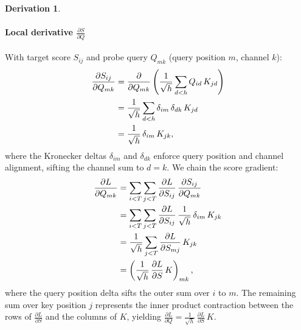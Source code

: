 \documentclass[letterpaper, 10 pt, conference]{ieeeconf}
\newcommand{\pdv}[2]{\frac{\partial #1}{\partial #2}}
\newcommand{\dL}[1]{\pdv{L}{#1}}
\newcommand{\kron}[2]{\delta_{#1 #2}}
\theoremstyle{definition}
\newtheorem*{derivation}{Derivation}
\begin{document}
\begin{derivation}
  \paragraph{Local derivative $\pdv{S}{Q}$}
  With target score $S_{ij}$ and probe query $Q_{mk}$ (query position $m$, channel $k$):
  \begin{align}
    \pdv{S_{ij}}{Q_{mk}}
     & = \pdv{}{Q_{mk}} \left( \frac{1}{\sqrt{h}} \sum_{d<h} Q_{id}\,K_{jd} \right) \notag \\
     & = \frac{1}{\sqrt{h}} \sum_{d<h} \kron{i}{m}\,\kron{d}{k}\,K_{jd} \notag             \\
     & = \frac{1}{\sqrt{h}}\,\kron{i}{m}\,K_{jk},
    \label{eq:att-dsdq}
  \end{align}
  where the Kronecker deltas $\kron{i}{m}$ and $\kron{d}{k}$ enforce query position and channel alignment, sifting the channel sum to $d = k$. We chain the score gradient:
  \begin{align}
    \dL{Q_{mk}}
     & = \sum_{i<T} \sum_{j<T} \dL{S_{ij}}\,\pdv{S_{ij}}{Q_{mk}} \notag                    \\
     & = \sum_{i<T} \sum_{j<T} \dL{S_{ij}}\,\frac{1}{\sqrt{h}}\,\kron{i}{m}\,K_{jk} \notag \\
     & = \frac{1}{\sqrt{h}} \sum_{j<T} \dL{S_{mj}}\,K_{jk} \notag                          \\
     & = \left( \frac{1}{\sqrt{h}}\,\dL{S}\,K \right)_{mk},
    \label{eq:att-chain-dq}
  \end{align}
  where the query position delta sifts the outer sum over $i$ to $m$. The remaining sum over key position $j$ represents the inner product contraction between the rows of $\dL{S}$ and the columns of $K$, yielding $\dL{Q} = \frac{1}{\sqrt{h}}\,\dL{S}\,K$.


\end{derivation}
\end{document}
